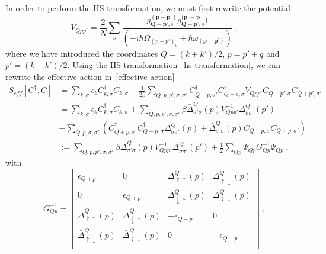 \documentclass{article}
\begin{document}
In order to perform the HS-transformation, we must first rewrite the potential 
\begin{equation}
    V_{Qpp'} = \frac{2}{N} \sum_s \frac{g_{\textbf{Q} + \textbf{p'},s}^{(\textbf{p} - \textbf{p'})} g_{\textbf{Q} - \textbf{p'},s}^{(\textbf{p'} - \textbf{p}})}{\left(-i\hbar\Omega_{(p-p')_0} + \hbar \omega_{(\textbf{p} - \textbf{p'})}\right)}\;,
    \label{potential in new coordinates}
\end{equation}
where we have introduced the coordinates $Q = (k + k') / 2 $, $p = p' + q$ and $p' = (k - k')/2$. Using the HS-transformation~\cref{hs-transformation}, we can rewrite the effective action in~\cref{effective action}
\begin{align}
S_{eff}[C^{\dagger},C] &= \sum_{k,\sigma} \epsilon_k C^{\dagger}_{k,\sigma} C_{k,\sigma} -  \frac{1}{2\beta} \sum_{Q,p,p',\sigma,\sigma'} C^{\dagger}_{Q + p,\sigma'} C^{\dagger}_{Q - p,\sigma} V_{Q p p'} C_{Q - p',\sigma}  C_{Q + p',\sigma'}\label{effective action transformed}\\
                       &=  \sum_{k,\sigma} \epsilon_k C^{\dagger}_{k,\sigma} C_{k,\sigma} +  \sum_{Q,p,p',\sigma,\sigma'} \beta \bar{\Delta}^{Q}_{\sigma' \sigma}(p) V^{-1}_{Q p p'} \Delta^{Q}_{\sigma \sigma'}(p')\nonumber\\
                       &- \sum_{Q,p,\sigma,\sigma'}\left( C^{\dagger}_{Q + p,\sigma'} C^{\dagger}_{Q - p,\sigma} \Delta^{Q}_{\sigma \sigma'}(p)+ \bar{\Delta}^{Q}_{\sigma' \sigma}(p)  C_{Q - p,\sigma} C_{Q + p,\sigma'} \right)\nonumber\\
                       &:= \sum_{Q,p,p',\sigma,\sigma'} \beta \bar{\Delta}^{Q}_{\sigma' \sigma}(p) V^{-1}_{Q p p'} \Delta^{Q}_{\sigma \sigma'}(p') + \frac{1}{2} \sum_{Q p} \bar{\Psi}_{Q p} G^{-1}_ {Q p} \Psi_{Q p}\;,
\end{align}
with 
\begin{equation}
     G_{Q p}^{-1} = 
\begin{bmatrix}
\epsilon_{Q + p} & 0                & \Delta^{Q}_{\uparrow \uparrow}(p) & \Delta^{Q}_{\uparrow \downarrow}(p) \\
         0       & \epsilon_{Q + p} & \Delta^{Q}_{\downarrow \uparrow}(p) & \Delta^{Q}_{\downarrow \downarrow}(p) \\
         \bar{\Delta}^{Q}_{\uparrow \uparrow}(p)       & \bar{\Delta}^{Q}_{\downarrow \uparrow}(p)                & -\epsilon_{Q-p} & 0 \\
         \bar{\Delta}^{Q}_{\uparrow \downarrow }(p)       & \bar{\Delta}^{Q}_{\downarrow \downarrow}(p)                & 0               & -\epsilon_{Q-p} \\
\end{bmatrix}\;,
\end{equation}
\end{document}

